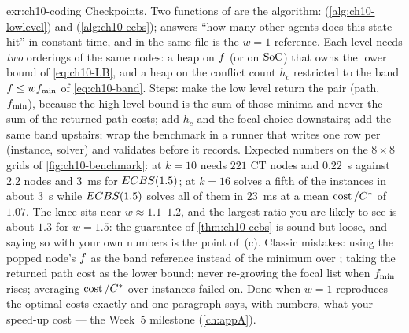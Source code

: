 
\begin{solution}{exr:ch10-coding}
Checkpoints. Two functions of  are the algorithm:
 (\cref{alg:ch10-lowlevel}) and 
(\cref{alg:ch10-ecbs});  answers ``how many other agents does this state
hit'' in constant time, and  in the same file is the $w=1$ reference. Each level
needs \emph{two} orderings of the same nodes: a heap on $f$ (or on $\mathrm{SoC}$) that
owns the lower bound of \cref{eq:ch10-LB}, and a heap on the conflict count $h_c$
restricted to the band $f\le wf_{\min}$ of \cref{eq:ch10-band}. Steps: make the
low level return the pair (path, $f_{\min}$), because the high-level bound is the sum
of those minima and never the sum of the returned path costs; add $h_c$ and the focal
choice downstairs; add the same band upstairs; wrap the benchmark in a runner that writes
one row per (instance, solver) and validates before it records. Expected numbers on the
$8\times8$ grids of \cref{fig:ch10-benchmark}: at $k=10$ \cbs needs $221$ CT nodes and
$0.22$~s against $2.2$ nodes and $3$~ms for $ECBS(1.5)$; at $k=16$ \cbs solves a fifth of
the instances in about $3$~s while $ECBS(1.5)$ solves all of them in $23$~ms at a mean
$\operatorname{cost}/C^*$ of $1.07$. The knee sits near $w\approx1.1$--$1.2$, and the largest ratio you
are likely to see is about $1.3$ for $w=1.5$: the guarantee of \cref{thm:ch10-ecbs} is
sound but loose, and saying so with your own numbers is the point of~(c). Classic
mistakes: using the popped node's $f$ as the band reference instead of the minimum
over \Open; taking the returned path cost as the lower bound; never re-growing the focal
list when $f_{\min}$ rises; averaging $\operatorname{cost}/C^*$ over instances \cbs failed on. Done
when $w=1$ reproduces the optimal costs exactly and one paragraph says, with numbers, what
your speed-up cost --- the Week~5 milestone (\cref{ch:appA}).
\end{solution}

